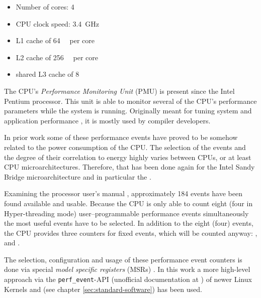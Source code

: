 \begin{itemize}

\item Number of cores: 4

\item CPU clock speed: \SI{3.4}{\giga\hertz}

\item L1 cache of \SI{64}{\kibi\byte} per core\cite{intel2011softdev1}

\item L2 cache of \SI{256}{\kibi\byte} per core\cite{intel2011softdev1}

\item shared L3 cache of \SI{8}{\mebi\byte}\cite{intel2011softdev1}

\end{itemize}


\label{sec:pmu}

The CPU's \emph{Performance Monitoring Unit} (PMU) is present since the
Intel\TReg{} Pentium processor. This unit is able to monitor several of the
CPU's performance parameters while the system is running. Originally meant for
tuning system and application performance \cite{intel2011softdev3b}, it is
mostly used by compiler developers.

In prior work \cite{bellosa2000benefits,snowdon2010operating,
weissel2002process,kellner03tempcontrol,bertran2010decomposable} some of these
performance events have proved to be somehow related to the power consumption of
the CPU. The selection of the events and the degree of their correlation to
energy highly varies between CPUs, or at least CPU microarchitectures.
Therefore, that has been done again for the Intel\TReg{} Sandy Bridge
microarchitecture and in particular the \JWPcpu{}.

Examining the processor user's manual \cite{intel2011events}, approximately 184
events have been found available and usable. Because the CPU is only able to
count eight (four in Hyper-threading \cite{wiki:HT} mode) user--programmable
performance events simultaneously \cite{intel2011softdev1} the most useful
events have to be selected. In addition to the eight (four) events, the CPU
provides three counters for fixed events, which will be counted anyway:
,  and
.

The selection, configuration and usage of these performance event counters is
done via special \emph{model specific registers} (MSRs)
\cite{intel2011softdev3b}. In this work a more high-level approach via the
\texttt{perf\_event}-API (unofficial documentation at
\cite{weaver2011perfevents}) of newer Linux Kernels and \JWTlibpfm{} (see
chapter \ref{sec:standard-software}) has been used.


